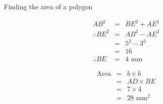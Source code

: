 \begin{wex}{Finding the area of a polygon}
{    
\begin{equation*}
\begin{array}{ccl}
AB^2 &=& BE^2 + AE^2\\
\therefore BE^2 &=& AB^2 - AE^2\\
	&=& 5^2 - 3^2\\
	 &=& 16\\
	\therefore BE &=& 4\mbox{ mm}
    \end{array}
\end{equation*}
    
\begin{equation*}
\begin{array}{ccl}
	\text{Area} &=& b \times h\\
&=& AD \times BE \\
		    &=& 7 \times 4\\
		    &=& 28 \mbox{ mm}^2
    \end{array}
\end{equation*}
    }
\end{wex}


